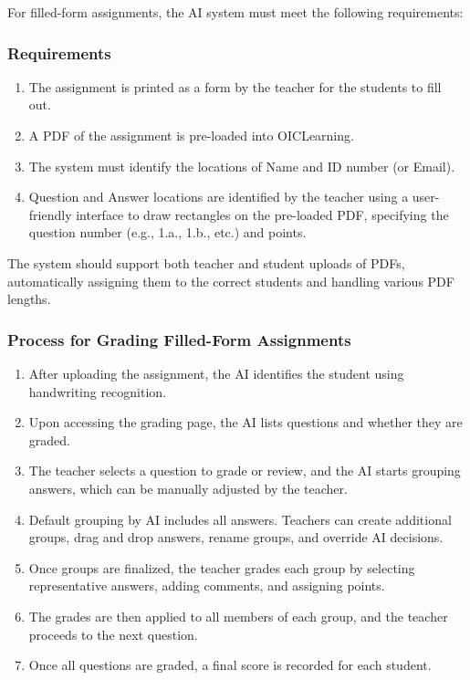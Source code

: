 \documentclass[ms,twoside,print]{nuthesis}
\begin{document}
For filled-form assignments, the AI system must meet the following requirements:

\subsubsection{Requirements}
\begin{enumerate}
    \item The assignment is printed as a form by the teacher for the students to fill out.
    \item A PDF of the assignment is pre-loaded into OICLearning.
    \item The system must identify the locations of Name and ID number (or Email).
    \item Question and Answer locations are identified by the teacher using a user-friendly interface to draw rectangles on the pre-loaded PDF, specifying the question number (e.g., 1.a., 1.b., etc.) and points.
\end{enumerate}

The system should support both teacher and student uploads of PDFs, automatically assigning them to the correct students and handling various PDF lengths.

\subsubsection{Process for Grading Filled-Form Assignments}
\begin{enumerate}
    \item After uploading the assignment, the AI identifies the student using handwriting recognition.
    \item Upon accessing the grading page, the AI lists questions and whether they are graded.
    \item The teacher selects a question to grade or review, and the AI starts grouping answers, which can be manually adjusted by the teacher.
    \item Default grouping by AI includes all answers. Teachers can create additional groups, drag and drop answers, rename groups, and override AI decisions.
    \item Once groups are finalized, the teacher grades each group by selecting representative answers, adding comments, and assigning points.
    \item The grades are then applied to all members of each group, and the teacher proceeds to the next question.
    \item Once all questions are graded, a final score is recorded for each student.
\end{enumerate}
\end{document}
